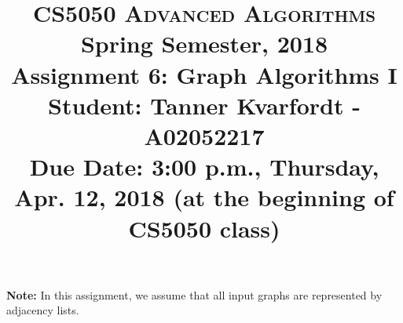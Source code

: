 \documentclass[11pt]{article}
\begin{document}
\baselineskip=14.0pt

\title{CS5050 \textsc{Advanced Algorithms}
\\{\Large Spring Semester, 2018}
\\ Assignment 6: Graph Algorithms I
\\ {\large \textbf{Student:} Tanner Kvarfordt - A02052217}
\\ {\large {\bf Due Date: 3:00 p.m.}, Thursday, Apr. 12, 2018 ({\bf at the beginning of CS5050 class})}}
\date{}


\maketitle

\vspace{-0.6in}

{\bf Note:} In this assignment, we assume that all input graphs are represented by adjacency lists.
\end{document}
